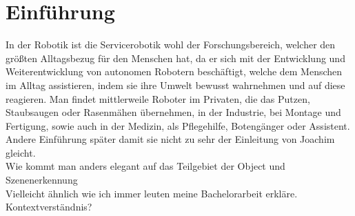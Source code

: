\chapter{Einführung}\label{ch:einleitung}

In der Robotik ist die Servicerobotik wohl der Forschungsbereich, welcher den größten Alltagsbezug für den Menschen hat, da er sich mit der Entwicklung und 
Weiterentwicklung von autonomen Robotern beschäftigt, welche dem Menschen im Alltag assistieren,
indem sie ihre Umwelt bewusst wahrnehmen und auf diese reagieren. Man findet mittlerweile Roboter im Privaten, die das Putzen, Staubsaugen oder Rasenmähen übernehmen,
in der Industrie, bei Montage und Fertigung, sowie auch in der Medizin, als Pflegehilfe, Botengänger oder Assistent.\\

Andere Einführung später damit sie nicht zu sehr der Einleitung von Joachim gleicht.\\
Wie kommt man anders elegant auf das Teilgebiet der Object und Szenenerkennung\\
Vielleicht ähnlich wie ich immer leuten meine Bachelorarbeit erkläre.\\
Kontextverständnis?
\\
\begin{deprecated}
\cite{davis93}


\end{deprecated}
